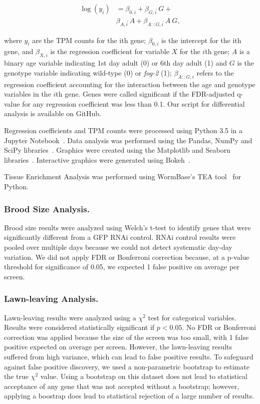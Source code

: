 \documentclass[10pt,letterpaper,twocolumn]{article}
\newcommand{\fog}{\emph{fog-2}}
\begin{document}
\begin{align*}
  \log(y_i) &= \beta_{0,i} + \beta_{G,i}\dot~G + \\
  &\beta_{A,i}\dot~A + \beta_{A::G,i}\dot~A~G,
  \label{eqn:GLM}
\end{align*}

where $y_i$ are the TPM counts for the ith gene; $\beta_{0,i}$ is the intercept for the ith gene, and $\beta_{X,i}$ is the regression coefficient for variable $X$ for the $i$th gene; $A$ is a binary age variable indicating 1st day adult (0) or 6th day adult (1) and $G$ is the genotype variable indicating wild-type (0) or \fog{} (1); $\beta_{A::G, i}$ refers to the regression coefficient accounting for the interaction between the age and genotype variables in the $i$th gene. Genes were called significant if the FDR-adjusted q-value for any regression coefficient was less than 0.1. Our script for differential analysis is available on GitHub.

Regression coefficients and TPM counts were processed using Python 3.5 in a Jupyter Notebook~\cite{Perez2007}. Data analysis was performed using the Pandas, NumPy and SciPy libraries~\cite{McKinney2011,VanDerWalt2011,Oliphant2007}. Graphics were created using the Matplotlib and Seaborn libraries~\cite{Waskom,Hunter2007}. Interactive graphics were generated using Bokeh~\cite{Team2014}.

Tissue Enrichment Analysis was performed using WormBase's TEA tool~\cite{Angeles-Albores2016} for Python.

\subsubsection*{Brood Size Analysis.}

Brood size results were analyzed using Welch's t-test to identify genes that were significantly different from a GFP RNAi control. RNAi control results were pooled over multiple days because we could not detect systematic day-day variation. We did not apply FDR or Bonferroni correction because, at a p-value threshold for significance of 0.05, we expected 1 false positive on average per screen.

\subsubsection*{Lawn-leaving Analysis.}

Lawn-leaving results were analyzed using a $\chi^2$ test for categorical variables. Results were considered statistically significant if $p<0.05$. No FDR or Bonferroni correction was applied because the size of the screen was too small, with 1 false positive expected on average per screen. However, the lawn-leaving results suffered from high variance, which can lead to false positive results.
To safeguard against false positive discovery, we used a non-parametric bootstrap to estimate the true $\chi^2$ value. Using a bootstrap on this dataset does not lead to statistical acceptance of any gene that was not accepted without a bootstrap; however, applying a boostrap does lead to statistical rejection of a large number of results.
\end{document}

